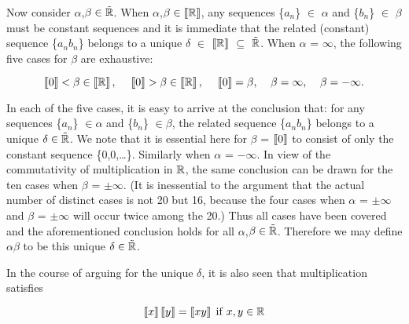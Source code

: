 \documentclass{article}
\begin{document}
Now consider $\alpha$,$\beta\in\tilde{{\bf {\mathbb R}}}$. When $\alpha$,$\beta\in\left[\kern-0.15em\left[{\bf {\mathbb R}}\right]\kern-0.15em\right]$, any sequences \{$a_{n} $\} $\in$ $\alpha$ and \{$b_{n} $\} $\in$ $\beta$ must be constant sequences and it is immediate that the related (constant) sequence \{$a_{n} b_{n} $\} belongs to a unique $\delta$ $\in$ $\left[\kern-0.15em\left[{\bf {\mathbb R}}\right]\kern-0.15em\right]$ $\subseteq$ $\tilde{{\bf {\mathbb R}}}$. When $\alpha$ = $\infty$, the following five cases for $\beta$ are exhaustive:

\[\left[\kern-0.15em\left[0\right]\kern-0.15em\right]<\beta \in \left[\kern-0.15em\left[{\bf {\mathbb R}}\right]\kern-0.15em\right],{\rm \; \; \; \; }\left[\kern-0.15em\left[0\right]\kern-0.15em\right]>\beta \in \left[\kern-0.15em\left[{\bf {\mathbb R}}\right]\kern-0.15em\right],{\rm \; \; \; \; }\left[\kern-0.15em\left[0\right]\kern-0.15em\right]=\beta ,{\rm \; \; \; \; }\beta =\infty ,{\rm \; \; \; \; }\beta =-\infty .\]

\noindent In each of the five cases, it is easy to arrive at the
conclusion that: for any sequences \{$a_{n} $\} $\in\alpha$ and
\{$b_{n} $\} $\in\beta$, the related sequence \{$a_{n} b_{n}
$\} belongs to a unique $\delta\in\tilde{{\bf {\mathbb
R}}}$. We note that it is essential here for $\beta$ =
$\left[\kern-0.15em\left[0\right]\kern-0.15em\right]$ to consist
of only the constant sequence \{0,0,\dots\}. Similarly when
$\alpha$ = $-\infty$. In view of the commutativity of
multiplication in ${\bf {\mathbb R}}$, the same conclusion can be
drawn for the ten cases when $\beta$ = $\pm\infty $. (It is
inessential to the argument that the actual number of distinct
cases is not 20 but 16, because the four cases when $\alpha$ =
$\pm\infty $ and $\beta$ = $\pm\infty $ will occur twice among
the 20.) Thus all cases have been covered and the aforementioned
conclusion holds for all $\alpha$,$\beta\in\tilde{{\bf
{\mathbb R}}}$. Therefore we may define $\alpha\beta$ to be this
unique $\delta\in\tilde{{\bf {\mathbb R}}}$.

In the course of arguing for the unique $\delta$, it is also seen that multiplication satisfies

\begin{equation} \label{ZEqnNum938796} \left[\kern-0.15em\left[x\right]\kern-0.15em\right]\left[\kern-0.15em\left[y\right]\kern-0.15em\right]=\left[\kern-0.15em\left[xy\right]\kern-0.15em\right]{\rm \; if\; }x,y\in {\bf {\mathbb R}} \end{equation}
\end{document}
